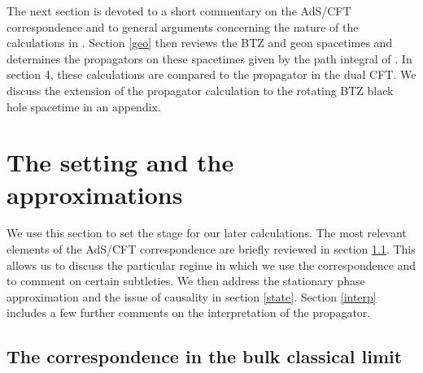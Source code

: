 \documentclass[a4paper,12pt]{article}
\begin{document}
The next section is devoted to a short commentary on the AdS/CFT
correspondence and to general arguments concerning the nature of the
calculations in \cite{holopart}.  Section \ref{geo} then reviews the
BTZ and geon spacetimes and determines the propagators on these
spacetimes given by the path integral of \cite{holopart}.  In section
4, these calculations are compared to the propagator in the dual
CFT. We discuss the extension of the propagator calculation to the
rotating BTZ black hole spacetime in an appendix.

\section{The setting and the approximations}
\label{gen}

We use this section to set the stage for our later calculations.  The
most relevant elements of the AdS/CFT correspondence are briefly
reviewed in section \ref{bcl}.  This allows us to discuss the
particular regime in which we use the correspondence and to comment on
certain subtleties.  We then address the stationary phase
approximation and the issue of causality in section \ref{state}.
Section \ref{interp} includes a few further comments on the
interpretation of the propagator.

\subsection{The correspondence in the bulk classical limit}
\label{bcl}
\end{document}
